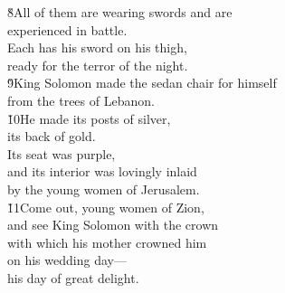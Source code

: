 \begin{poetry}
\poeml \v{8}All of them are wearing swords and are \\
\poemll    experienced in battle. \\
\poeml Each has his sword on his thigh, \\
\poemll    ready for the terror of the night. \\
\poeml \v{9}King Solomon made the sedan chair for himself \\
\poemll    from the trees of Lebanon. \\
\poeml \v{10}He made its posts of silver, \\
\poemll    its back of gold. \\
\poeml Its seat was purple, \\
\poemll    and its interior was lovingly inlaid \\
\poemlll       by the young women of Jerusalem. \\
\poeml \v{11}Come out, young women of Zion, \\
\poemll    and see King Solomon with the crown \\
\poeml with which his mother crowned him \\
\poemll    on his wedding day--- \\
\poemlll       his day of great delight.
\end{poetry}

